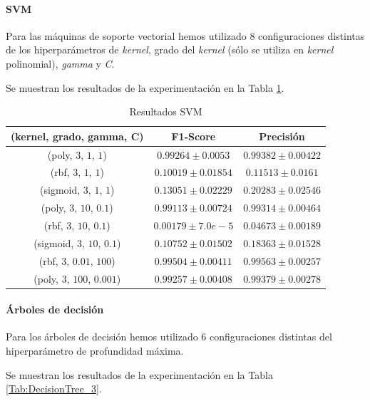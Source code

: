 \documentclass[12pt]{article}
\begin{document}
\paragraph{SVM}

Para las máquinas de soporte vectorial hemos utilizado 8 configuraciones distintas de los hiperparámetros de \textit{kernel},
grado del \textit{kernel} (sólo se utiliza en \textit{kernel} polinomial), \textit{gamma} y \textit{C}.

Se muestran los resultados de la experimentación en la Tabla \ref{Tab:SVM_3}.

\begin{table}[!ht]
	\caption{Resultados SVM}
	\centering
		 \begin{tabular}{||c c c||}
			 \hline
			 (kernel, grado, gamma, C) & F1-Score & Precisión  \\ [0.5ex]
			 \hline\hline
			 (poly, $3$, $1$, $1$) & $0.99264 \pm 0.0053$ & $0.99382 \pm 0.00422$ \\
			\hline
			(rbf, $3$, $1$, $1$) & $0.10019 \pm 0.01854$ & $0.11513 \pm 0.0161$ \\
			\hline
			(sigmoid, $3$, $1$, $1$) & $0.13051 \pm 0.02229$ & $0.20283 \pm 0.02546$ \\
			\hline
			(poly, $3$, $10$, $0.1$) & $0.99113 \pm 0.00724$ & $0.99314 \pm 0.00464$ \\
			\hline
			(rbf, $3$, $10$, $0.1$) & $0.00179 \pm 7.0e-5$ & $0.04673 \pm 0.00189$ \\
			\hline
			(sigmoid, $3$, $10$, $0.1$) & $0.10752 \pm 0.01502$ & $0.18363 \pm 0.01528$ \\
			\hline
			(rbf, $3$, $0.01$, $100$) & $0.99504 \pm 0.00411$ & $0.99563 \pm 0.00257$ \\
			\hline
			(poly, $3$, $100$, $0.001$) & $0.99257 \pm 0.00408$ & $0.99379 \pm 0.00278$ \\
			\hline
		 \end{tabular}
	\label{Tab:SVM_3}
	\end{table}

\paragraph{Árboles de decisión}
Para los árboles de decisión hemos utilizado 6 configuraciones distintas del hiperparámetro de profundidad máxima.

Se muestran los resultados de la experimentación en la Tabla \ref{Tab:DecisionTree_3}.
\end{document}

